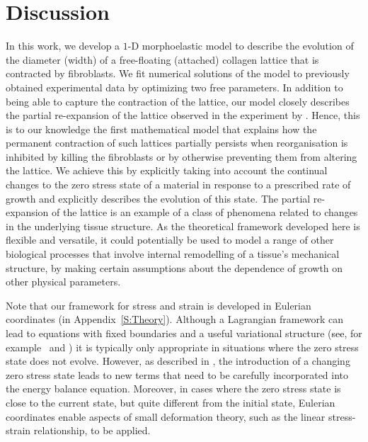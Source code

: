 \section{Discussion}
\label{S:discussion}


In this work, we develop a $1$-D morphoelastic model to describe the evolution of the diameter (width) of a free-floating (attached) collagen lattice that is contracted by fibroblasts. We fit numerical solutions of the model to previously obtained experimental data by optimizing two free parameters. In addition to being able to capture the contraction of the lattice, our model closely describes the partial re-expansion of the lattice observed in the experiment by \citet{Guidry1985}. Hence, this is to our knowledge the first mathematical model that explains how the permanent contraction of such lattices partially persists when reorganisation is inhibited by killing the fibroblasts or by otherwise preventing them from altering the lattice. We achieve this by explicitly taking into account the continual changes to the zero stress state of a material in response to a prescribed rate of growth and explicitly describes the evolution of this state. The partial re-expansion of the lattice is an example of a class of phenomena related to changes in the underlying tissue structure. As the theoretical framework developed here is flexible and versatile, it could potentially be used to model a range of other biological processes that involve internal remodelling of a tissue's mechanical structure, by making certain assumptions about the dependence of growth on other physical parameters.

Note that our framework for stress and strain is developed in Eulerian coordinates (in Appendix~\ref{S:Theory}). Although a Lagrangian framework can lead to equations with fixed boundaries and a useful variational structure (\textcolor{black}{see}, for example~\citet{RobertsCM} and \citet{GonzalezCM}) it is typically only appropriate in situations where the zero stress state does not evolve. However, as described in \citet{Yavari2010}, the introduction of a changing zero stress state leads to new terms that need to be carefully incorporated into the energy balance equation. Moreover, in cases where the zero stress state is close to the current state, but quite different from the initial state, Eulerian coordinates enable aspects of small deformation theory, such as the linear stress-strain relationship, to be applied.

